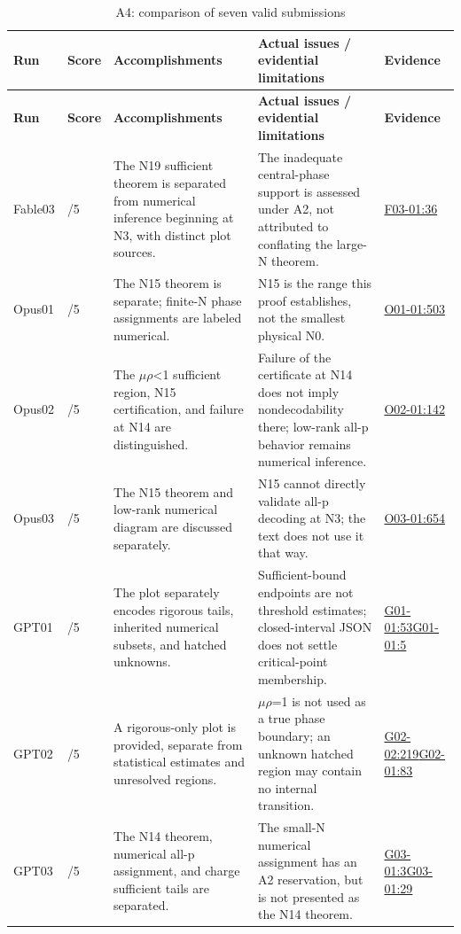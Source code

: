 \documentclass[11pt,a4paper]{article}
\begin{document}
{\fontsize{9.0}{12.6}\selectfont
\setlength{\tabcolsep}{2.5pt}
\begin{longtable}{>{\raggedright\arraybackslash}p{}>{\raggedright\arraybackslash}p{}>{\raggedright\arraybackslash}p{}>{\raggedright\arraybackslash}p{}>{\raggedright\arraybackslash}p{}}
\caption{A4: comparison of seven valid submissions}\\
\toprule
\textbf{Run} & \textbf{Score} & \textbf{Accomplishments} & \textbf{Actual issues /\allowbreak{} evidential limitations} & \textbf{Evidence}\tabularnewline
\midrule
\endfirsthead
\toprule
\textbf{Run} & \textbf{Score} & \textbf{Accomplishments} & \textbf{Actual issues /\allowbreak{} evidential limitations} & \textbf{Evidence}\tabularnewline
\midrule
\endhead
{}Fable03 & 5/\allowbreak{}5 & The N19 sufficient theorem is separated from numerical inference beginning at N3,\allowbreak{} with distinct plot sources. & The inadequate central-phase support is assessed under A2,\allowbreak{} not attributed to conflating the large-N theorem. & \hyperref[src:F03-01]{F03-01:36}\tabularnewline
{}Opus01 & 5/\allowbreak{}5 & The N15 theorem is separate; finite-N phase assignments are labeled numerical. & N15 is the range this proof establishes,\allowbreak{} not the smallest physical N0. & \hyperref[src:O01-01]{O01-01:503}\tabularnewline
{}Opus02 & 5/\allowbreak{}5 & The \ensuremath{\mu}\ensuremath{\rho}<1 sufficient region,\allowbreak{} N15 certification,\allowbreak{} and failure at N14 are distinguished. & Failure of the certificate at N14 does not imply nondecodability there; low-rank all-p behavior remains numerical inference. & \hyperref[src:O02-01]{O02-01:142}\tabularnewline
{}Opus03 & 5/\allowbreak{}5 & The N15 theorem and low-rank numerical diagram are discussed separately. & N15 cannot directly validate all-p decoding at N3; the text does not use it that way. & \hyperref[src:O03-01]{O03-01:654}\tabularnewline
{}GPT01 & 5/\allowbreak{}5 & The plot separately encodes rigorous tails,\allowbreak{} inherited numerical subsets,\allowbreak{} and hatched unknowns. & Sufficient-bound endpoints are not threshold estimates; closed-interval JSON does not settle critical-point membership. & \hyperref[src:G01-01]{G01-01:53}\newline \hyperref[src:G01-01]{G01-01:5}\tabularnewline
{}GPT02 & 5/\allowbreak{}5 & A rigorous-only plot is provided,\allowbreak{} separate from statistical estimates and unresolved regions. & \ensuremath{\mu}\ensuremath{\rho}=1 is not used as a true phase boundary; an unknown hatched region may contain no internal transition. & \hyperref[src:G02-02]{G02-02:219}\newline \hyperref[src:G02-01]{G02-01:83}\tabularnewline
{}GPT03 & 5/\allowbreak{}5 & The N14 theorem,\allowbreak{} numerical all-p assignment,\allowbreak{} and charge sufficient tails are separated. & The small-N numerical assignment has an A2 reservation,\allowbreak{} but is not presented as the N14 theorem. & \hyperref[src:G03-01]{G03-01:3}\newline \hyperref[src:G03-01]{G03-01:29}\tabularnewline
\bottomrule
\end{longtable}
}
\end{document}
